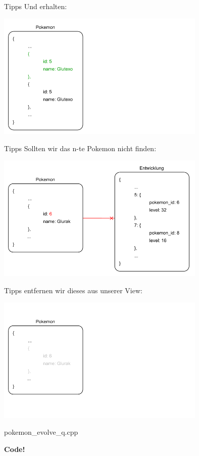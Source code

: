 \begin{frame}{Tipps}
    Und erhalten:

    \begin{center}
        \includegraphics[width=0.75\textwidth]{pictures/example_5.pdf}
    \end{center}
\end{frame}

\begin{frame}{Tipps}
    Sollten wir das n-te Pokemon nicht finden:

    \begin{center}
        \includegraphics[width=0.75\textwidth]{pictures/example_6.pdf}
    \end{center}
\end{frame}

\begin{frame}{Tipps}
    entfernen wir dieses aus unserer View:

    \begin{center}
        \includegraphics[width=0.75\textwidth]{pictures/example_7.pdf}
    \end{center}
\end{frame}

\begin{frame}{pokemon\_evolve\_q.cpp}
    \begin{center}
        \textbf{Code!}
    \end{center}
\end{frame}